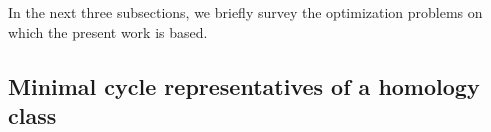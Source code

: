 




\label{sec:minimalgenerators}

In the next three subsections, we briefly survey the optimization problems on which the present work is based.

\subsection{Minimal cycle representatives of a homology class} \label{singlecyclecase}


